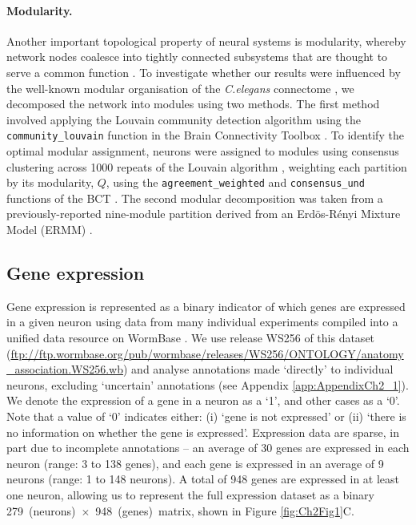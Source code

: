 \paragraph{Modularity.}
Another important topological property of neural systems is modularity, whereby network nodes coalesce into tightly connected subsystems that are thought to serve a common function \citep{Sporns2016}.
To investigate whether our results were influenced by the well-known modular organisation of the \emph{C.elegans} connectome \citep{Kim2014a, Pan2010, Bassett2010, Achacoso1992, Pavlovic2014}, we decomposed the network into modules using two methods.
The first method involved applying the Louvain community detection algorithm \citep{Blondel2008} using the \texttt{community\_louvain} function in the Brain Connectivity Toolbox \citep{Rubinov2010}.
To identify the optimal modular assignment, neurons were assigned to modules using consensus clustering across 1000 repeats of the Louvain algorithm \citep{Lancichinetti2012}, weighting each partition by its modularity, $Q$, using the \texttt{agreement\_weighted} and \texttt{consensus\_und} functions of the BCT \citep{Rubinov2010}.
The second modular decomposition was taken from a previously-reported nine-module partition derived from an Erd\"os-R\'enyi Mixture Model (ERMM) \citep{Pavlovic2014}.

\subsection*{Gene expression}
Gene expression is represented as a binary indicator of which genes are expressed in a given neuron using data from many individual experiments compiled into a unified data resource on WormBase \citep{Harris2010}.
We use release WS256 of this dataset (\url{ftp://ftp.wormbase.org/pub/wormbase/releases/WS256/ONTOLOGY/anatomy_association.WS256.wb}) and analyse annotations made `directly' to individual neurons, excluding `uncertain' annotations (see Appendix \ref{app:AppendixCh2_1}).
We denote the expression of a gene in a neuron as a `1', and other cases as a `0'.
Note that a value of `0' indicates either:
(i) `gene is not expressed' or
(ii) `there is no information on whether the gene is expressed'.
Expression data are sparse, in part due to incomplete annotations -- an average of 30 genes are expressed in each neuron (range: 3 to 138 genes), and each gene is expressed in an average of 9 neurons (range: 1 to 148 neurons).
A total of 948 genes are expressed in at least one neuron, allowing us to represent the full expression dataset as a binary \mbox{279 (neurons) $\times$ 948 (genes) matrix}, shown in Figure \ref{fig:Ch2Fig1}C.

